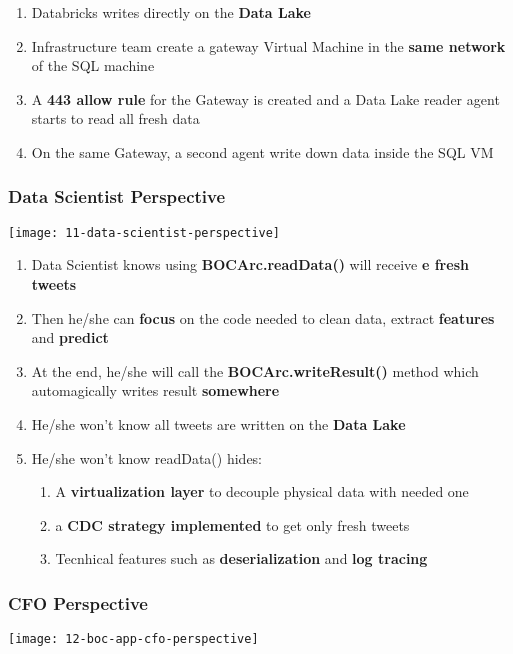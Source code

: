 \begin{enumerate}
	\item Databricks writes directly on the \textbf{Data Lake}
	\item Infrastructure team create a gateway Virtual Machine in the \textbf{same network} of the SQL machine
	\item A \textbf{443 allow rule} for the Gateway is created and a Data Lake reader agent starts to read all fresh data
	\item On the same Gateway, a second agent write down data inside the SQL VM
\end{enumerate}

\subsubsection{Data Scientist Perspective}
\begin{center}
\texttt{[image: 11-data-scientist-perspective]}
\end{center}

\begin{enumerate}
	\item Data Scientist knows using \textbf{BOCArc.readData()} will receive \textbf{e fresh tweets}
	\item Then he/she can \textbf{focus} on the code needed to clean data, extract \textbf{features} and \textbf{predict}
	\item At the end, he/she will call the \textbf{BOCArc.writeResult()} method which automagically writes result \textbf{somewhere}
	\item He/she won’t know all tweets are
written on the \textbf{Data Lake}
	\item He/she won’t know readData() hides:
	\begin{enumerate}
		\item A \textbf{virtualization layer} to decouple physical data with needed one
		\item a \textbf{CDC strategy implemented} to get only fresh tweets
		\item Tecnhical features such as \textbf{deserialization} and \textbf{log tracing}
	\end{enumerate}
\end{enumerate}

\subsubsection{CFO Perspective}
\begin{center}
\texttt{[image: 12-boc-app-cfo-perspective]}
\end{center}